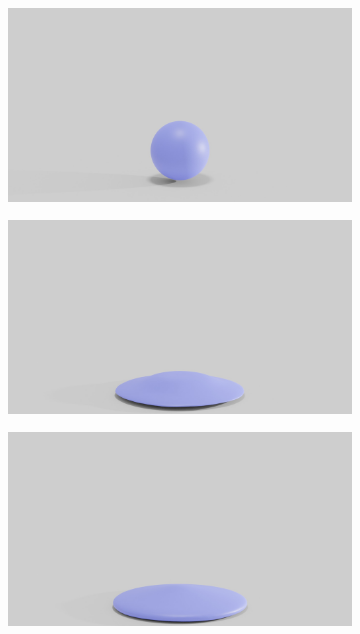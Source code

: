 \begin{figure}[htp!]
\begin{subfigure}{.16\linewidth}
		{\includegraphics[width=2.0\textwidth]{images/soft_ball/vp/0200.jpg}}
		\label{sfig:ball-vc-1}
	\end{subfigure}%
	\begin{subfigure}{.16\linewidth}
		\centering
		{\includegraphics[width=2.0\textwidth]{images/soft_ball/vp/0250.jpg}}
		\label{sfig:ball-vc-2}
	\end{subfigure}%
	\begin{subfigure}{.16\linewidth}
		\centering
		{\includegraphics[width=2.0\textwidth]{images/soft_ball/vp/0300.jpg}}

\end{subfigure}
\end{figure}
